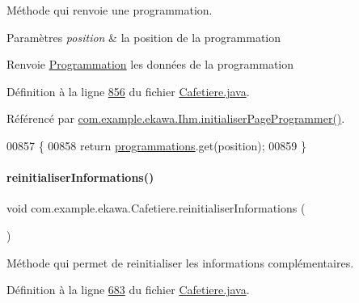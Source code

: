 Méthode qui renvoie une programmation. 


\begin{DoxyParams}{Paramètres}
{\em position} & la position de la programmation \\
\hline
\end{DoxyParams}
\begin{DoxyReturn}{Renvoie}
\hyperlink{classcom_1_1example_1_1ekawa_1_1_programmation}{Programmation} les données de la programmation 
\end{DoxyReturn}


Définition à la ligne \hyperlink{_cafetiere_8java_source_l00856}{856} du fichier \hyperlink{_cafetiere_8java_source}{Cafetiere.\+java}.



Référencé par \hyperlink{_ihm_8java_source_l00668}{com.\+example.\+ekawa.\+Ihm.\+initialiser\+Page\+Programmer()}.


\begin{DoxyCode}
00857     \{
00858         \textcolor{keywordflow}{return} \hyperlink{classcom_1_1example_1_1ekawa_1_1_cafetiere_a987c8e1bcea506b65f4b05f955b3f699}{programmations}.get(position);
00859     \}
\end{DoxyCode}
\mbox{\label{classcom_1_1example_1_1ekawa_1_1_cafetiere_a18e77fd60191cc0b2c7e247f72807096}} 
\paragraph{\texorpdfstring{reinitialiser\+Informations()}{reinitialiserInformations()}}
{\footnotesize\ttfamily void com.\+example.\+ekawa.\+Cafetiere.\+reinitialiser\+Informations (\begin{DoxyParamCaption}{ }\end{DoxyParamCaption})}



Méthode qui permet de reinitialiser les informations complémentaires. 



Définition à la ligne \hyperlink{_cafetiere_8java_source_l00683}{683} du fichier \hyperlink{_cafetiere_8java_source}{Cafetiere.\+java}.



